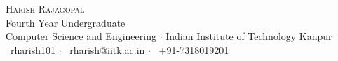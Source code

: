 \newcommand{\sep}{$\cdot$ }  %

\begin{center}

\textsc{\huge Harish Rajagopal}\\[2mm]
Fourth Year Undergraduate\\[1mm]
Computer Science and Engineering \sep Indian Institute of Technology Kanpur\\[1mm]
{\faGithub\ \href{https://github.com/rharish101}{rharish101}} \sep
{\faEnvelopeO\ \href{mailto:rharish@iitk.ac.in}{rharish@iitk.ac.in}} \sep
{\faMobile\ +91-7318019201}

\end{center}
